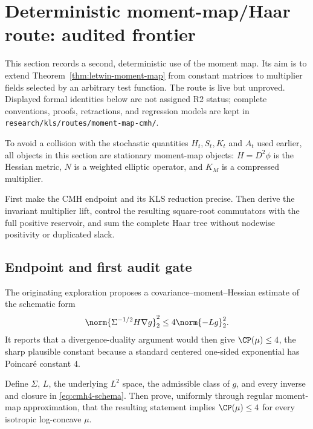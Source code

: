 \documentclass[../../main.tex]{subfiles}
\begin{document}
\section{Deterministic moment-map/Haar route: audited frontier}
\label{sec:moment-map-cmh}

This section records a second, deterministic use of the moment map. Its aim is to extend
Theorem~\ref{thm:letwin-moment-map} from constant matrices to multiplier fields selected by an
arbitrary test function. The route is live but unproved. Displayed formal identities below are
not assigned R2 status; complete conventions, proofs, retractions, and regression models are kept
in \texttt{research/kls/routes/moment-map-cmh/}.

To avoid a collision with the stochastic quantities $H_t,S_t,K_t$ and $A_t$ used earlier, all
objects in this section are stationary moment-map objects: $H=D^2\phi$ is the Hessian metric,
$N$ is a weighted elliptic operator, and $K_M$ is a compressed multiplier.

\begin{program}
\label{prog:cmh-route}
First make the CMH endpoint and its KLS reduction precise. Then derive the invariant multiplier
lift, control the resulting square-root commutators with the full positive reservoir, and sum the
complete Haar tree without nodewise positivity or duplicated slack.
\end{program}

\subsection{Endpoint and first audit gate}

The originating exploration proposes a covariance--moment--Hessian estimate of the schematic
form
\begin{equation}
  \norm{\Sigma^{-1/2}H\nabla g}_2^2
  \le4\norm{-Lg}_2^2.
  \label{eq:cmh4-schema}
\end{equation}
It reports that a divergence-duality argument would then give $\CP(\mu)\le4$, the sharp plausible
constant because a standard centered one-sided exponential has Poincar\'e constant $4$.

\begin{question}
\label{q:cmh-normalization}
Define $\Sigma$, $L$, the underlying $L^2$ space, the admissible class of $g$, and every inverse
and closure in \eqref{eq:cmh4-schema}. Then prove, uniformly through regular moment-map
approximation, that the resulting statement implies $\CP(\mu)\le4$ for every isotropic
log-concave $\mu$.
\end{question}
\end{document}
